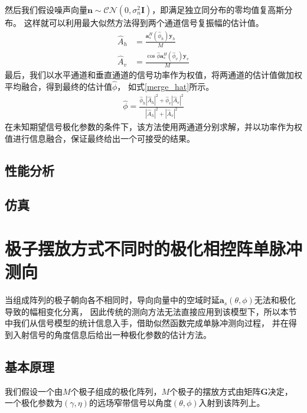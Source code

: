 \documentclass[master]{thesis-uestc}
\begin{document}
然后我们假设噪声向量$\bm{n}\sim\mathcal{CN}(0,\sigma_n^2\bm{I})$，即满足独立同分布的零均值复高斯分布。
这样就可以利用最大似然方法得到两个通道信号复振幅的估计值\cite{Ma}。
\begin{subequations}\label{dual_amp_hat}
    \begin{align}
        \hat{A}_h &= \frac{\bm{a}_s^H(\hat{\phi}_h)\bm{y}_h}{M} \\
        \hat{A}_v &= \frac{\cos\hat{\phi}\bm{a}_s^H(\hat{\phi}_v)\bm{y}_v}{M}
    \end{align}
\end{subequations}
最后，我们以水平通道和垂直通道的信号功率作为权值，将两通道的估计值做加权平均融合，得到最终的估计值$\hat{\phi}$，
如式\eqref{merge_hat}所示。
\begin{equation}\label{merge_hat}
    \begin{aligned}
        \hat{\phi} = 
        \frac{\hat{\phi}_h\left|\hat{A}_h\right|^2+\hat{\phi}_v\left|\hat{A}_v\right|^2}
        {\left|\hat{A}_h\right|^2+\left|\hat{A}_v\right|^2}
    \end{aligned}
\end{equation}
在未知期望信号极化参数的条件下，该方法使用两通道分别求解，并以功率作为权值进行信息融合，保证最终给出一个可接受的结果。

\subsection{性能分析}

\subsection{仿真}

\section{极子摆放方式不同时的极化相控阵单脉冲测向}
当组成阵列的极子朝向各不相同时，导向向量中的空域时延$\bm{a}_s(\theta,\phi)$无法和极化导致的幅相变化分离，
因此传统的测向方法无法直接应用到该模型下，所以本节中我们从信号模型的统计信息入手，借助似然函数完成单脉冲测向过程，
并在得到入射信号的角度信息后给出一种极化参数的估计方法。

\subsection{基本原理}
我们假设一个由$M$个极子组成的极化阵列，$M$个极子的摆放方式由矩阵$\bm{G}$决定，
一个极化参数为$(\gamma,\eta)$的远场窄带信号以角度$(\theta,\phi)$入射到该阵列上。
\end{document}
